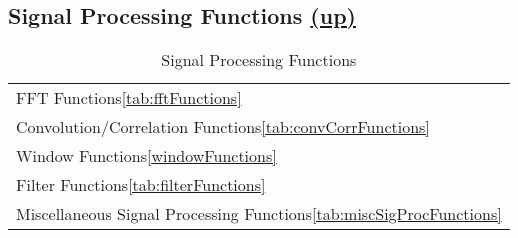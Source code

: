 \subsection*{Signal Processing Functions \hyperlink{VSIPspecHead}{(up)}}
\begin{table}[H]
\hypertarget{vsiplSignalProcessing}{}
\caption{Signal Processing Functions}
\label{tab:signalProcessingFunctions}
\begin{center}
\begin{tabular}{|l|}\hline
FFT Functions\ref{tab:fftFunctions}\\
Convolution/Correlation Functions\ref{tab:convCorrFunctions}\\
Window Functions\ref{windowFunctions}\\
Filter Functions\ref{tab:filterFunctions}\\
Miscellaneous Signal Processing Functions\ref{tab:miscSigProcFunctions}\\
\hline\end{tabular}
\end{center}
\label{default}
\end{table}%
      
      
      
      
      